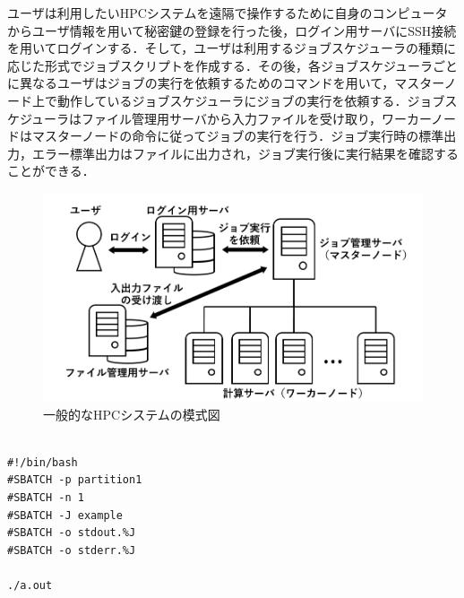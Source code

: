 ユーザは利用したいHPCシステムを遠隔で操作するために自身のコンピュータからユーザ情報を用いて秘密鍵の登録を行った後，ログイン用サーバにSSH接続を用いてログインする．そして，ユーザは利用するジョブスケジューラの種類に応じた形式でジョブスクリプトを作成する．その後，各ジョブスケジューラごとに異なるユーザはジョブの実行を依頼するためのコマンドを用いて，マスターノード上で動作しているジョブスケジューラにジョブの実行を依頼する．ジョブスケジューラはファイル管理用サーバから入力ファイルを受け取り，ワーカーノードはマスターノードの命令に従ってジョブの実行を行う．ジョブ実行時の標準出力，エラー標準出力はファイルに出力され，ジョブ実行後に実行結果を確認することができる．\par

\begin{figure}[tb]
    \centering
    \includegraphics[width=120mm]{./fig/HPCsystem.png}
    \caption{一般的なHPCシステムの模式図}
    \label{fig4}
\end{figure}

\begin{lstlisting}[caption=Slurmのジョブスクリプトファイル作成例, label=job_script]

#!/bin/bash
#SBATCH -p partition1
#SBATCH -n 1
#SBATCH -J example
#SBATCH -o stdout.%J
#SBATCH -o stderr.%J
    
./a.out
    
\end{lstlisting}

